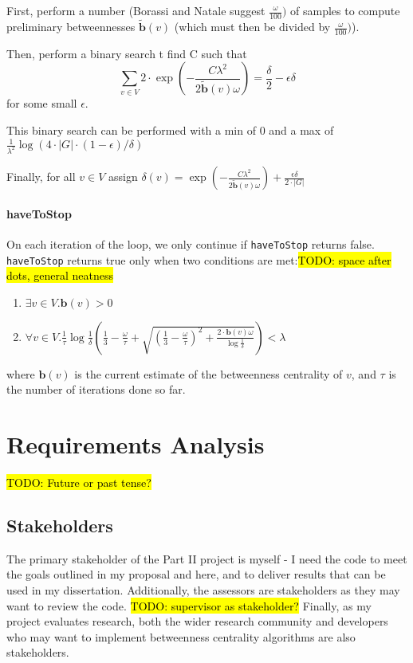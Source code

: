 \documentclass[12pt,a4paper,twoside,openright]{report}
\newcommand{\todo}[1]{\hl{TODO: #1}}
\newcommand{\ttt}[1]{\texttt{#1}}
\begin{document}
	First, perform a number (Borassi and Natale suggest $\frac{\omega}{100})$ of samples to compute preliminary betweennesses $\tilde{\bm{b}}(v)$ (which must then be divided by $\frac{\omega}{100})$).
	
	Then, perform a binary search t find C such that \begin{equation}
		\sum_{v \in V} 2 \cdot \exp(-\frac{C \lambda^2}{2 \tilde{\bm{b}}(v) \omega}) = \frac{\delta}{2} - \epsilon \delta
	\end{equation}
	for some small $\epsilon$.
	
	This binary search can be performed with a min of $0$ and a max of $\frac{1}{\lambda^2} \log(4 \cdot|G|\cdot(1-\epsilon)/\delta)$
	
	Finally, for all $v \in V$ assign $\delta(v) = \exp(-\frac{C \lambda^2}{2 \tilde{\bm{b}}(v) \omega}) + \frac{\epsilon \delta}{2 \cdot |G|}$
	
	\paragraph{haveToStop}	
	
	On each iteration of the loop, we only continue if \ttt{haveToStop} returns false. \ttt{haveToStop} returns true only when two conditions are met:\todo{space after dots, general neatness}
	\begin{enumerate} 
		\item $\exists v \in V. \bm{b}(v) > 0$
		\item $\forall v \in V. \frac{1}{\tau} \log \frac{1}{\delta}(\frac{1}{3}-\frac{\omega}{\tau}+\sqrt{(\frac{1}{3}-\frac{\omega}{\tau})^2+\frac{2\cdot \bm{b}(v) \omega}{\log \frac{1}{\delta}}})< \lambda$
	\end{enumerate}

	where $\bm{b}(v)$ is the current estimate of the betweenness centrality of $v$, and $\tau$ is the number of iterations done so far.
	
\section{Requirements Analysis} \todo{Future or past tense?}
	\subsection{Stakeholders}
	The primary stakeholder of the Part II project is myself - I need the code to meet the goals outlined in my proposal and here, and to deliver results that can be used in my dissertation. Additionally, the assessors are stakeholders as they may want to review the code. \todo{supervisor as stakeholder?} Finally, as my project evaluates research, both the wider research community and developers who may want to implement betweenness centrality algorithms are also stakeholders.
\end{document}
